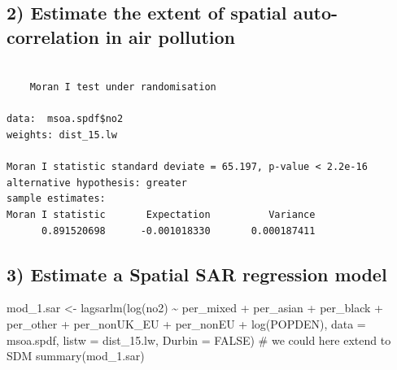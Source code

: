\documentclass[
  letterpaper,
]{scrbook}
\newenvironment{Shaded}{\begin{snugshade}}{\end{snugshade}}
\newcommand{\AttributeTok}[1]{\textcolor[rgb]{0.40,0.45,0.13}{#1}}
\newcommand{\CommentTok}[1]{\textcolor[rgb]{0.37,0.37,0.37}{#1}}
\newcommand{\ConstantTok}[1]{\textcolor[rgb]{0.56,0.35,0.01}{#1}}
\newcommand{\FunctionTok}[1]{\textcolor[rgb]{0.28,0.35,0.67}{#1}}
\newcommand{\NormalTok}[1]{\textcolor[rgb]{0.00,0.23,0.31}{#1}}
\newcommand{\OtherTok}[1]{\textcolor[rgb]{0.00,0.23,0.31}{#1}}
\newcommand{\SpecialCharTok}[1]{\textcolor[rgb]{0.37,0.37,0.37}{#1}}
\begin{document}
\hypertarget{estimate-the-extent-of-spatial-auto-correlation-in-air-pollution}{%
\subsection*{2) Estimate the extent of spatial auto-correlation in air
pollution}\label{estimate-the-extent-of-spatial-auto-correlation-in-air-pollution}}

\begin{Shaded}
\end{Shaded}

\begin{verbatim}

    Moran I test under randomisation

data:  msoa.spdf$no2  
weights: dist_15.lw    

Moran I statistic standard deviate = 65.197, p-value < 2.2e-16
alternative hypothesis: greater
sample estimates:
Moran I statistic       Expectation          Variance 
      0.891520698      -0.001018330       0.000187411 
\end{verbatim}

\hypertarget{estimate-a-spatial-sar-regression-model}{%
\subsection*{3) Estimate a Spatial SAR regression
model}\label{estimate-a-spatial-sar-regression-model}}

\begin{Shaded}
\begin{Highlighting}[]
\NormalTok{mod\_1.sar }\OtherTok{\textless{}{-}} \FunctionTok{lagsarlm}\NormalTok{(}\FunctionTok{log}\NormalTok{(no2) }\SpecialCharTok{\textasciitilde{}}\NormalTok{ per\_mixed }\SpecialCharTok{+}\NormalTok{ per\_asian }\SpecialCharTok{+}\NormalTok{ per\_black }\SpecialCharTok{+}\NormalTok{ per\_other}
                      \SpecialCharTok{+}\NormalTok{ per\_nonUK\_EU }\SpecialCharTok{+}\NormalTok{ per\_nonEU  }\SpecialCharTok{+} \FunctionTok{log}\NormalTok{(POPDEN),  }
                      \AttributeTok{data =}\NormalTok{ msoa.spdf, }
                      \AttributeTok{listw =}\NormalTok{ dist\_15.lw,}
                      \AttributeTok{Durbin =} \ConstantTok{FALSE}\NormalTok{) }\CommentTok{\# we could here extend to SDM}
\FunctionTok{summary}\NormalTok{(mod\_1.sar)}
\end{Highlighting}
\end{Shaded}
\end{document}
